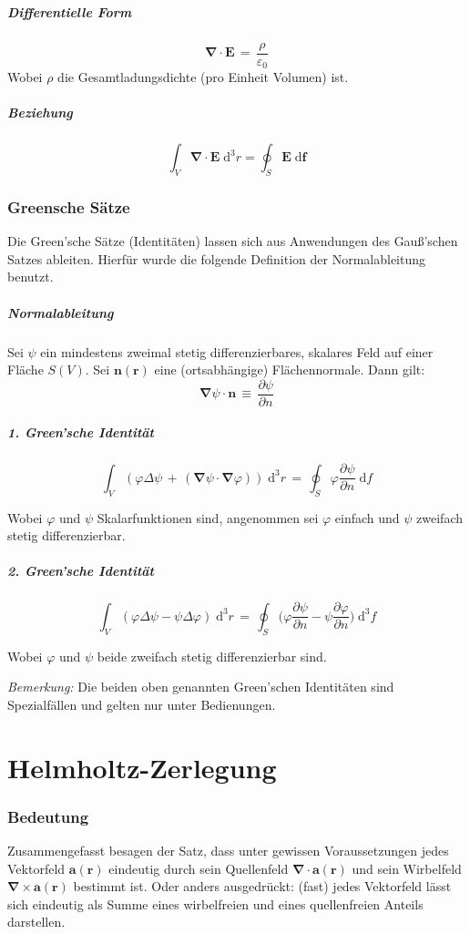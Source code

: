 \documentclass[titlepage,11pt,a4paper,ngerman]{report}
\renewcommand{\vec}[1]{\bm{#1}}
\renewcommand{\epsilon}{\varepsilon}
\newcommand{\vabla}{\vec{\nabla}}
\renewcommand{\paragraph}[1]{\subsubsection{#1}}
\begin{document}
\subparagraph{Differentielle Form}
\[\vec{\nabla}\cdot\vec{E}\,=\,\frac{\rho}{\epsilon_0}\]
Wobei $\rho$ die Gesamtladungsdichte (pro Einheit Volumen) ist.

\subparagraph{Beziehung}
$$\int_{V} \vabla \cdot \vec{E}\;\mathrm{d}^{3}r = \oint_{S}\vec{E}\;\mathrm{d}\vec{f}$$
\hfill \break

\paragraph{Greensche Sätze}
Die Green’sche Sätze (Identitäten) lassen sich aus Anwendungen des Gauß’schen Satzes ableiten. Hierfür wurde die folgende Definition der Normalableitung benutzt.

\subparagraph{Normalableitung} \hfill \break
Sei $\psi$ ein mindestens zweimal stetig differenzierbares, skalares Feld auf einer Fläche $S(V)$. Sei $\vec{n}(\vec{r})$ eine (ortsabhängige) Flächennormale. Dann gilt:
\[\vec{\nabla}\psi\cdot\vec{n}\,\equiv\,\frac{\partial\psi}{\partial n}\]

\subparagraph{1. Green'sche Identität}
\[\int_V(\varphi\Delta\psi\,+\,(\vabla\psi\cdot\vabla\varphi))\;\mathrm{d}^3r\,=\,\oint_{S}\varphi\frac{\partial\psi}{\partial n}\;\mathrm{d}f\]

Wobei $\varphi$ und $\psi$ Skalarfunktionen sind, angenommen sei $\varphi$ einfach und $\psi$ zweifach stetig differenzierbar.

\subparagraph{2. Green'sche Identität}
\[\int_V (\varphi\Delta\psi-\psi\Delta\varphi)\;\mathrm{d}^3r\,=\,\oint_{S}\bigg(\varphi\frac{\partial\psi}{\partial n}-\psi\frac{\partial\varphi}{\partial n}\bigg)\;\mathrm{d}^3f\]

Wobei $\varphi$ und $\psi$ beide zweifach stetig differenzierbar sind.

\bigskip
\emph{Bemerkung:} Die beiden oben genannten Green'schen Identitäten sind Spezialfällen und gelten nur unter Bedienungen.

\section{Helmholtz-Zerlegung}
\paragraph{Bedeutung}
Zusammengefasst besagen der Satz, dass unter gewissen Voraussetzungen jedes Vektorfeld $\vec{a}(\vec{r})$ eindeutig durch sein Quellenfeld $\vabla\cdot\vec{a}(\vec{r})$ und sein Wirbelfeld $\vabla\times\vec{a}(\vec{r})$ bestimmt ist. Oder anders ausgedrückt: (fast) jedes Vektorfeld lässt sich eindeutig als Summe eines wirbelfreien und eines quellenfreien Anteils darstellen.
\end{document}
